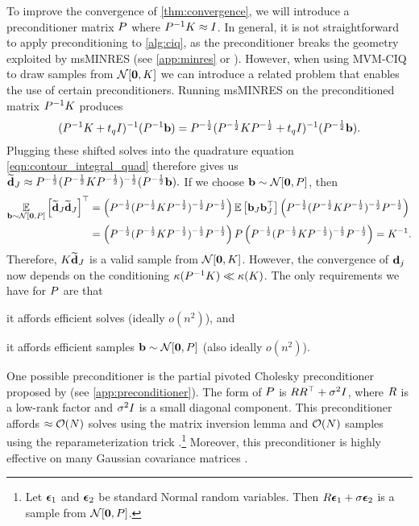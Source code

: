 To improve the convergence of \cref{thm:convergence}, we will introduce a preconditioner matrix $P$ where $P^{-1} K \approx I$.
In general, it is not straightforward to apply preconditioning to \cref{alg:ciq}, as the preconditioner breaks the geometry exploited by msMINRES (see \cref{app:minres} or \cite{aune2013iterative,jegerlehner1996krylov}).
However, when using MVM-CIQ to draw samples from $\normaldist{\bzero}{\bK}$ we can introduce a related problem that enables the use of certain preconditioners.
Running msMINRES on the preconditioned matrix $P^{-1} K$ produces
%
\[
	(P^{-1} K + t_q I)^{-1} (P^{-1} \mathbf{b})
	=
	P^{-\frac 1 2} (P^{-\frac 1 2} K P^{-\frac 1 2} + t_q I)^{-1} (P^{-\frac 1 2} \mathbf{b}).
\]
%
Plugging these shifted solves into the quadrature equation \cref{eqn:contour_integral_quad} therefore gives us
%
$
	\widetilde {\mathbf{d}}_J \approx P^{-\frac 1 2} (P^{-\frac 1 2} K P^{-\frac 1 2})^{-\frac 1 2} (P^{-\frac 1 2} \mathbf{b}).
$
%
If we choose $\bb \sim \normaldist{\bzero}{\bP}$, then
%
\begin{align*}
	\Evover{\bb \sim \normaldist{\bzero}{\bP}}{\widetilde \bd_J \widetilde \bd_J}^\top
	&=
	\left( \bP^{-\frac 1 2} (\bP^{-\frac 1 2} \bK \bP^{-\frac 1 2})^{-\frac 1 2} \bP^{-\frac 1 2} \right)
	\Ev{ \bb_J \bb_J^\top}
	\left( \bP^{-\frac 1 2} (\bP^{-\frac 1 2} \bK \bP^{-\frac 1 2})^{-\frac 1 2} \bP^{-\frac 1 2} \right)
	\\
	&=
	\left( \bP^{-\frac 1 2} (\bP^{-\frac 1 2} \bK \bP^{-\frac 1 2})^{-\frac 1 2} \bP^{-\frac 1 2} \right)
	\bP
	\left( \bP^{-\frac 1 2} (\bP^{-\frac 1 2} \bK \bP^{-\frac 1 2})^{-\frac 1 2} \bP^{-\frac 1 2} \right)
	=
	\bK^{-1}.
\end{align*}
%
Therefore, $K \widetilde {\mathbf{d}}_J$ is a valid sample from $\normaldist{\bzero}{\bK}$.
However, the convergence of $\mathbf{d}_j$ now depends on the conditioning $\kappa(P^{-1} K) \ll \kappa(K)$.
The only requirements we have for $P$ are that
\begin{enumerate*}
	\item it affords efficient solves (ideally $o(n^2)$), and
	\item it affords efficient samples $\bb \sim \normaldist{\bzero}{\bP}$ (also ideally $o(n^2)$).
\end{enumerate*}

One possible preconditioner is the partial pivoted Cholesky preconditioner proposed by \citet{gardner2018gpytorch} (see \cref{app:preconditioner}).
The form of $P$ is $R R^\top + \sigma^2 I$, where $R$ is a low-rank factor and $\sigma^2 I$ is a small diagonal component.
This preconditioner affords $\approx \bigo{N}$ solves using the matrix inversion lemma and $\bigo{N}$ samples using the reparameterization trick \cite{kingma2013auto,rezende2014stochastic}.\footnote{
	Let $\boldsymbol{\epsilon}_1$ and $\boldsymbol{\epsilon}_2$ be standard Normal random variables.
	Then $R \boldsymbol{\epsilon}_1 + \sigma \boldsymbol{\epsilon}_2$ is a sample from $\normaldist{\bzero}{\bP}$.
}
Moreover, this preconditioner is highly effective on many Gaussian covariance matrices \cite{gardner2018gpytorch,wang2019exact}.





